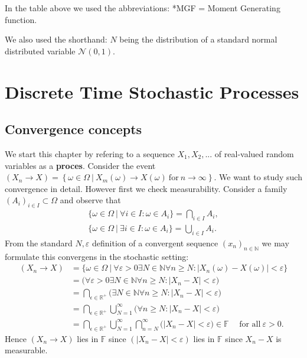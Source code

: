 \documentclass[
]{book}
\begin{document}
In the table above we used the abbreviations: *MGF = Moment Generating function.

We also used the shorthand: \(N\) being the distribution of a standard normal distributed variable \(\mathcal{N}(0,1)\).

\hypertarget{discrete-time-stochastic-processes}{%
\chapter{Discrete Time Stochastic Processes}\label{discrete-time-stochastic-processes}}

\hypertarget{convergence-concepts}{%
\section{Convergence concepts}\label{convergence-concepts}}

We start this chapter by refering to a sequence \(X_1,X_2,...\) of real-valued random variables as a \textbf{proces}. Consider the event \((X_n\to X)=\left\{\omega\in\Omega\ \vert\ X_m(\omega)\to X(\omega)\ \text{for}\ n\to \infty\right\}\). We want to study such convergence in detail. However first we check measurability. Consider a family \((A_i)_{i\in I}\subset \Omega\) and observe that
\begin{align*}
    \Big\{\omega\in \Omega\ \vert\ \forall i\in I : \omega \in A_i\Big\}=\bigcap_{i\in I} A_i,\tag{2.1}\\
    \Big\{\omega\in \Omega\ \vert\ \exists i\in I : \omega \in A_i\Big\}=\bigcup_{i\in I} A_i.\tag{2.2}
\end{align*}
From the standard \(N,\varepsilon\) definition of a convergent sequence \((x_n)_{n\in \mathbb{N}}\) we may formulate this convergens in the stochastic setting:
\begin{align*}
    (X_n\to X)&=\Big\{\omega\in \Omega\ \vert\ \forall\varepsilon>0 \exists N\in \mathbb{N} \forall n\ge N : \vert X_n(\omega)-X(\omega)\vert <\varepsilon\Big\}\\
    &=\Big(\forall\varepsilon>0 \exists N\in \mathbb{N} \forall n\ge N : \vert X_n-X\vert <\varepsilon\Big)\\
    &=\bigcap_{\epsilon\in \mathbb{R}^+}\Big(\exists N\in \mathbb{N} \forall n\ge N : \vert X_n-X\vert<\varepsilon\Big)\\
    &=\bigcap_{\epsilon\in \mathbb{R}^+}\bigcup_{N=1}^\infty\Big( \forall n\ge N : \vert X_n-X\vert<\varepsilon\Big)\\
    &=\bigcap_{\epsilon\in \mathbb{R}^+}\bigcup_{N=1}^\infty\bigcap_{n=N}^\infty\Big(  \vert X_n-X\vert<\varepsilon\Big)\in \mathbb{F}\hspace{15pt}\text{for all}\ \varepsilon>0.
\end{align*}
Hence \((X_n\to X)\) lies in \(\mathbb{F}\) since \((\vert X_n-X\vert <\varepsilon)\) lies in \(\mathbb{F}\) since \(X_n-X\) is measurable.
\end{document}
